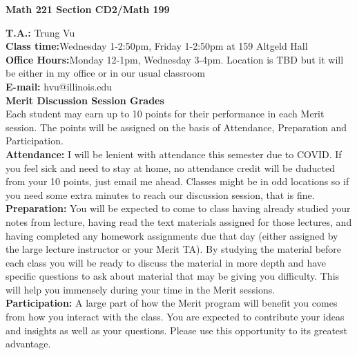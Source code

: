 \documentclass[12pt]{article}
\begin{document}
\begin{center}
\textbf{Math 221 Section CD2/Math 199}
\end{center}

\noindent \textbf{T.A.:} Trung Vu\\	
\textbf{Class time:}Wednesday 1-2:50pm, Friday 1-2:50pm at 159 Altgeld Hall \\
\textbf{Office Hours:}Monday 12-1pm, Wednesday 3-4pm. Location is TBD but it will be either in my office or in our usual classroom\\
\textbf{E-mail:} hvu@illinois.edu\\

\noindent \textbf{Merit Discussion Session Grades}\\
Each student may earn up to 10 points for their performance in each Merit session. The points will be assigned on the basis of Attendance, Preparation and Participation.\\
\textbf{Attendance:} I will be lenient with attendance this semester due to COVID. If you feel sick and need to stay at home, no attendance credit will be duducted from  your 10 points, just email me ahead. Classes might be in odd locations so if you need some extra minutes to reach our discussion session, that is fine.\\
\textbf{Preparation:} You will be expected to come to class having already studied your notes from lecture, having read the text materials assigned for those lectures, and having completed any homework assignments due that day (either assigned by the large lecture instructor or your Merit TA). By studying the material before each class you will be ready to discuss the material in more depth and have specific questions to ask about material that may be giving you difficulty. This will help you immensely during your time in the Merit sessions.\\
\textbf{Participation:}  A large part of how the Merit program will benefit you comes from how you interact with the class.  You are expected to contribute your ideas and insights as well as your questions.  Please use this opportunity to its greatest advantage.\\
\end{document}
